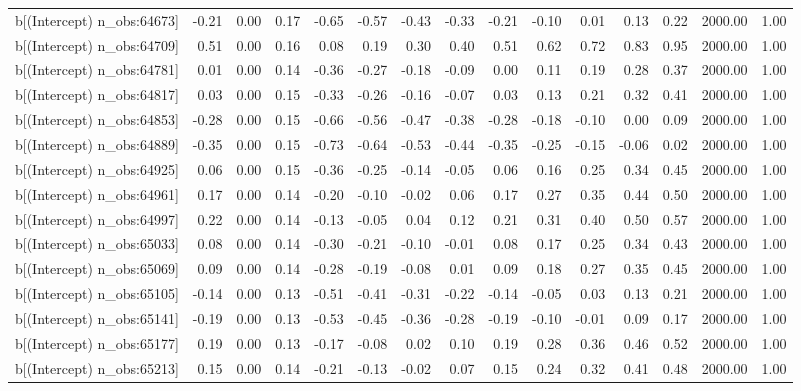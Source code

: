 \begin{table}[ht]
\begin{tabular}{rrrrrrrrrrrrrrr}
  b[(Intercept) n\_obs:64673] & -0.21 & 0.00 & 0.17 & -0.65 & -0.57 & -0.43 & -0.33 & -0.21 & -0.10 & 0.01 & 0.13 & 0.22 & 2000.00 & 1.00 \\ 
  b[(Intercept) n\_obs:64709] & 0.51 & 0.00 & 0.16 & 0.08 & 0.19 & 0.30 & 0.40 & 0.51 & 0.62 & 0.72 & 0.83 & 0.95 & 2000.00 & 1.00 \\ 
  b[(Intercept) n\_obs:64781] & 0.01 & 0.00 & 0.14 & -0.36 & -0.27 & -0.18 & -0.09 & 0.00 & 0.11 & 0.19 & 0.28 & 0.37 & 2000.00 & 1.00 \\ 
  b[(Intercept) n\_obs:64817] & 0.03 & 0.00 & 0.15 & -0.33 & -0.26 & -0.16 & -0.07 & 0.03 & 0.13 & 0.21 & 0.32 & 0.41 & 2000.00 & 1.00 \\ 
  b[(Intercept) n\_obs:64853] & -0.28 & 0.00 & 0.15 & -0.66 & -0.56 & -0.47 & -0.38 & -0.28 & -0.18 & -0.10 & 0.00 & 0.09 & 2000.00 & 1.00 \\ 
  b[(Intercept) n\_obs:64889] & -0.35 & 0.00 & 0.15 & -0.73 & -0.64 & -0.53 & -0.44 & -0.35 & -0.25 & -0.15 & -0.06 & 0.02 & 2000.00 & 1.00 \\ 
  b[(Intercept) n\_obs:64925] & 0.06 & 0.00 & 0.15 & -0.36 & -0.25 & -0.14 & -0.05 & 0.06 & 0.16 & 0.25 & 0.34 & 0.45 & 2000.00 & 1.00 \\ 
  b[(Intercept) n\_obs:64961] & 0.17 & 0.00 & 0.14 & -0.20 & -0.10 & -0.02 & 0.06 & 0.17 & 0.27 & 0.35 & 0.44 & 0.50 & 2000.00 & 1.00 \\ 
  b[(Intercept) n\_obs:64997] & 0.22 & 0.00 & 0.14 & -0.13 & -0.05 & 0.04 & 0.12 & 0.21 & 0.31 & 0.40 & 0.50 & 0.57 & 2000.00 & 1.00 \\ 
  b[(Intercept) n\_obs:65033] & 0.08 & 0.00 & 0.14 & -0.30 & -0.21 & -0.10 & -0.01 & 0.08 & 0.17 & 0.25 & 0.34 & 0.43 & 2000.00 & 1.00 \\ 
  b[(Intercept) n\_obs:65069] & 0.09 & 0.00 & 0.14 & -0.28 & -0.19 & -0.08 & 0.01 & 0.09 & 0.18 & 0.27 & 0.35 & 0.45 & 2000.00 & 1.00 \\ 
  b[(Intercept) n\_obs:65105] & -0.14 & 0.00 & 0.13 & -0.51 & -0.41 & -0.31 & -0.22 & -0.14 & -0.05 & 0.03 & 0.13 & 0.21 & 2000.00 & 1.00 \\ 
  b[(Intercept) n\_obs:65141] & -0.19 & 0.00 & 0.13 & -0.53 & -0.45 & -0.36 & -0.28 & -0.19 & -0.10 & -0.01 & 0.09 & 0.17 & 2000.00 & 1.00 \\ 
  b[(Intercept) n\_obs:65177] & 0.19 & 0.00 & 0.13 & -0.17 & -0.08 & 0.02 & 0.10 & 0.19 & 0.28 & 0.36 & 0.46 & 0.52 & 2000.00 & 1.00 \\ 
  b[(Intercept) n\_obs:65213] & 0.15 & 0.00 & 0.14 & -0.21 & -0.13 & -0.02 & 0.07 & 0.15 & 0.24 & 0.32 & 0.41 & 0.48 & 2000.00 & 1.00 \\ 

\end{tabular}
\end{table}
